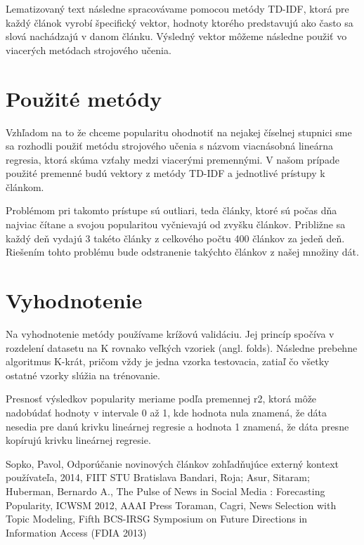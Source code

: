 \documentclass[runningheads,a4paper]{llncs}
\begin{document}
Lematizovaný text následne spracovávame pomocou metódy TD-IDF, ktorá pre každý článok vyrobí špecifický vektor, hodnoty ktorého predstavujú ako často sa slová nachádzajú v danom článku.
Výsledný vektor môžeme následne použiť vo viacerých metódach strojového učenia.

\section{Použité metódy}
Vzhľadom na to že chceme popularitu ohodnotiť na nejakej číselnej stupnici sme sa rozhodli použiť metódu strojového učenia s názvom viacnásobná lineárna regresia, ktorá skúma vzťahy medzi viacerými premennými.
V našom prípade použité premenné budú vektory z metódy TD-IDF a jednotlivé prístupy k článkom.

Problémom pri takomto prístupe sú outliari, teda články, ktoré sú počas dňa najviac čítane a svojou popularitou vyčnievajú od zvyšku článkov. Približne sa každý deň vydajú 3 takéto články z celkového počtu 400 článkov za jedeň deň. Riešením tohto problému bude odstranenie takýchto článkov z našej množiny dát.



\section{Vyhodnotenie}
Na vyhodnotenie metódy používame krížovú validáciu.
Jej princíp spočíva v rozdelení datasetu na K rovnako veľkých vzoriek (angl. folds).
Následne prebehne algoritmus K-krát, pričom vždy je jedna vzorka testovacia, zatiaľ čo všetky ostatné vzorky slúžia na trénovanie.

Presnosť výsledkov popularity meriame podľa premennej r2, ktorá môže nadobúdať hodnoty v intervale 0 až 1, kde hodnota nula znamená, že dáta nesedia pre danú krivku lineárnej regresie a hodnota 1 znamená, že dáta presne kopírujú krivku lineárnej regresie.



\begin{thebibliography}{7}
   Sopko, Pavol, Odporúčanie novinových článkov zohľadňujúce externý kontext používateľa, 2014, FIIT STU Bratislava
   Bandari, Roja; Asur, Sitaram; Huberman, Bernardo A., The Pulse of News in Social Media : Forecasting Popularity, ICWSM 2012, AAAI Press
   Toraman, Cagri, News Selection with Topic Modeling, Fifth BCS-IRSG Symposium on Future Directions in Information Access (FDIA 2013)
\end{thebibliography}
\end{document}
